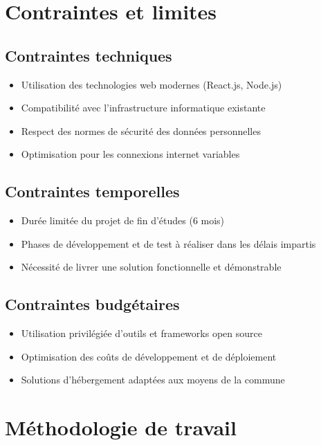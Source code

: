 \section{Contraintes et limites}

\subsection{Contraintes techniques}

\begin{itemize}
\item Utilisation des technologies web modernes (React.js, Node.js)
\item Compatibilité avec l'infrastructure informatique existante
\item Respect des normes de sécurité des données personnelles
\item Optimisation pour les connexions internet variables
\end{itemize}

\subsection{Contraintes temporelles}

\begin{itemize}
\item Durée limitée du projet de fin d'études (6 mois)
\item Phases de développement et de test à réaliser dans les délais impartis
\item Nécessité de livrer une solution fonctionnelle et démonstrable
\end{itemize}

\subsection{Contraintes budgétaires}

\begin{itemize}
\item Utilisation privilégiée d'outils et frameworks open source
\item Optimisation des coûts de développement et de déploiement
\item Solutions d'hébergement adaptées aux moyens de la commune
\end{itemize}

\section{Méthodologie de travail}

